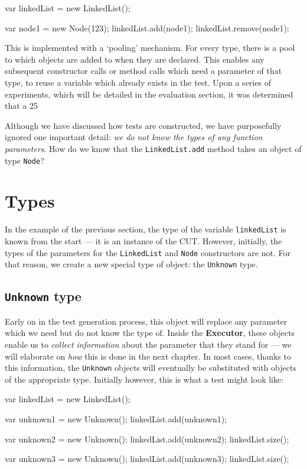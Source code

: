\begin{verbcode}
var linkedList = new LinkedList();

var node1 = new Node(123);
linkedList.add(node1);
linkedList.remove(node1);
\end{verbcode}

This is implemented with a `pooling' mechanism. For every type, there is a pool to which objects are added to when they are declared. This enables any subsequent constructor calls or method calls which need a parameter of that type, to reuse a variable which already exists in the test. Upon a series of experiments, which will be detailed in the evaluation section, it was determined that a 25%

Although we have discussed how tests are constructed, we have purposefully ignored one important detail: \emph{we do not know the types of any function parameters}. How do we know that the \texttt{LinkedList.add} method takes an object of type \texttt{Node}?

\section{Types}

In the example of the previous section, the type of the variable \texttt{linkedList} is known from the start --- it is an instance of the CUT. However, initially, the types of the parameters for the \texttt{LinkedList} and \texttt{Node} constructors are not. For that reason, we create a new special type of object: the \texttt{Unknown} type.

\subsection{\texttt{Unknown} type}

Early on in the test generation process, this object will replace any parameter which we need but do not know the type of. Inside the \textbf{Executor}, these objects enable us to \emph{collect information} about the parameter that they stand for --- we will elaborate on \emph{how} this is done in the next chapter. In most cases, thanks to this information, the \texttt{Unknown} objects will eventually be substituted with objects of the appropriate type. Initially however, this is what a test might look like:

\begin{verbcode}
var linkedList = new LinkedList();

var unknown1 = new Unknown();
linkedList.add(unknown1);

var unknown2 = new Unknown();
linkedList.add(unknown2);
linkedList.size();

var unknown3 = new Unknown();
linkedList.add(unknown3);
linkedList.size();
\end{verbcode}

